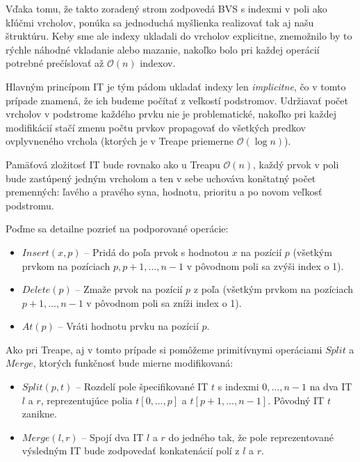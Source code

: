 \documentclass[a4paper, 12pt]{article}
\theoremstyle{definition}
\begin{document}
Vďaka tomu, že takto zoradený strom zodpovedá BVS s indexmi v poli ako kľúčmi
vrcholov, ponúka sa jednoduchá myšlienka realizovať tak aj našu štruktúru. Keby
sme ale indexy ukladali do vrcholov explicitne, znemožnilo by to rýchle náhodné
vkladanie alebo mazanie, nakoľko bolo pri každej operácií potrebné prečíslovať
až $\mathcal{O}(n)$ indexov.

Hlavným princípom IT je tým pádom ukladať indexy len \emph{implicitne}, čo v
tomto prípade znamená, že ich budeme počítať z veľkostí podstromov.
Udržiavať počet vrcholov v podstrome každého prvku nie je problematické,
nakoľko pri každej modifikácií stačí zmenu počtu prvkov propagovať do všetkých
predkov ovplyvneného vrchola (ktorých je v Treape priemerne $\mathcal{O}(\log
n)$).

Pamäťová zložitosť IT bude rovnako ako u Treapu $\mathcal{O}(n)$, každý prvok v
poli bude zastúpený jedným vrcholom a ten v sebe uchováva konštatný počet
premenných: ľavého a pravého syna, hodnotu, prioritu a po novom veľkosť
podstromu.

Poďme sa detailne pozrieť na podporované operácie:

\begin{itemize}
    \item $Insert(x, p)$ -- Pridá do poľa prvok s hodnotou $x$ na pozícií $p$
        (všetkým prvkom na pozíciach $p, p+1, \ldots, n-1$ v pôvodnom poli sa
        zvýši index o 1).
    \item $Delete(p)$ -- Zmaže prvok na pozícií $p$ z poľa (všetkým prvkom na
        pozíciach $p+1, \ldots, n-1$ v pôvodnom poli sa zníži index o 1).
    \item $At(p)$ -- Vráti hodnotu prvku na pozícií $p$.
\end{itemize}

Ako pri Treape, aj v tomto prípade si pomôžeme primitívnymi operáciami $Split$
a $Merge$, ktorých funkčnosť bude mierne modifikovaná:

\begin{itemize}
    \item $Split(p, t)$ -- Rozdelí pole špecifikované IT $t$
        s indexmi $0, \ldots, n-1$ na dva IT $l$ a $r$, reprezentujúce polia
        $t[0, \ldots, p]$ a $ t[p+1, \ldots, n-1]$. Pôvodný IT $t$ zanikne.
    \item $Merge(l, r)$ -- Spojí dva IT $l$ a $r$ do jedného tak, že pole
        reprezentované výsledným IT bude zodpovedať konkatenácií polí z $l$ a
        $r$.
\end{itemize}
\end{document}
